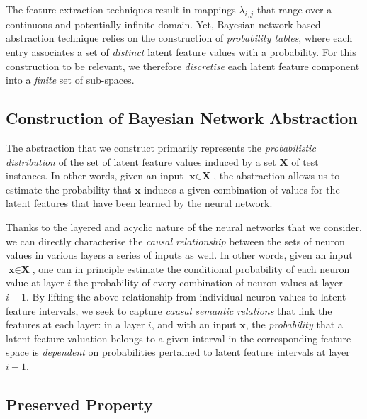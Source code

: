 The feature extraction techniques 
result in mappings $\lambda_{i,j}%
$ that range over a continuous and potentially infinite domain.
Yet, Bayesian network-based abstraction technique relies on the construction of \emph{probability tables}, where each entry associates a set of \emph{distinct} latent feature values with a probability.
For this construction to be relevant, we therefore \emph{discretise} each latent feature component into a \emph{finite} set of sub-spaces.

%

\subsection{Construction of Bayesian Network Abstraction}
\label{sec:constr-bayes-netw}


The abstraction that we construct primarily represents the \emph{probabilistic distribution} of the set of latent feature values induced by a set $\textbf{X}$ of test instances.
In other words, given an input \(\textbf{x} \in 
\textbf{X}\), the abstraction allows us to estimate the probability that $\textbf{x}$ induces a given combination of values for the latent features that have been learned by the neural network.

Thanks to the layered and a\-cyclic nature of the neural networks that we consider, we can directly characterise the \emph{causal relationship} between the sets of neuron values in various layers \wrt a series of inputs as well.
In other words, given an input \(\textbf{x} \in 
\textbf{X}\), one can in principle estimate the conditional probability of each neuron value at layer $i$ \wrt the probability of every combination of neuron values at layer $i-1$.
By lifting the above relationship from individual neuron values to latent feature intervals, we seek to capture \emph{causal semantic relations} that link the features at each layer: in a layer $i$, and with an input $\textbf{x}$, the \emph{probability} that a latent feature valuation belongs to a given interval in the corresponding feature space is \emph{dependent} on probabilities pertained to latent feature intervals at layer $i-1$.



\subsection{Preserved Property}

